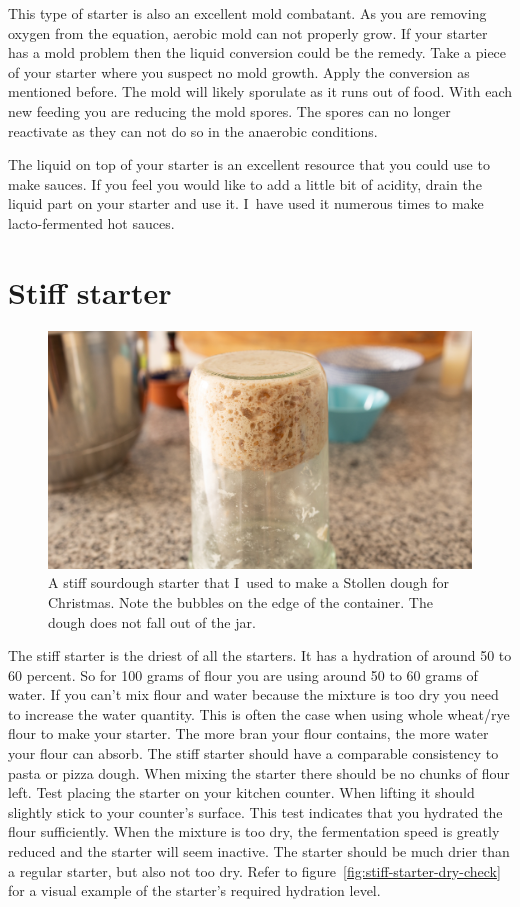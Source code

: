 This type of starter is also an excellent mold combatant. As you are removing
oxygen from the equation, aerobic mold can not properly grow. If your starter
has a mold problem then the liquid conversion could be the remedy. Take a
piece of your starter where you suspect no mold growth. Apply the conversion
as mentioned before. The mold will likely sporulate as it runs out of food.
With each new feeding you are reducing the mold spores. The spores can no
longer reactivate as they can not do so in the anaerobic conditions.

The liquid on top of your starter is an excellent resource that you could use
to make sauces. If you feel you would like to add a little bit of acidity,
drain the liquid part on your starter and use it. I~have used it numerous
times to make lacto-fermented hot sauces.

\section{Stiff starter}%
\label{section:stiff-starter}

\begin{figure}[!htb]
  \includegraphics[width=\textwidth]{sourdough-starter-stiff.jpg}
  \caption{A stiff sourdough starter that I~used to make a Stollen dough for Christmas. Note
  the bubbles on the edge of the container. The dough does not fall out of the
jar.}%
  \label{fig:stiff-sourdough-starter}
\end{figure}

The stiff starter is the driest of all the starters. It has a hydration of
around 50 to 60 percent. So for 100 grams of flour you are using around 50 to
60 grams of water. If you can't mix flour and water because the
mixture is too dry you need to increase the water quantity. This is often
the case when using whole wheat/rye flour to make your starter. The
more bran your flour contains, the more water your flour can absorb. The stiff
starter should have a comparable consistency to pasta or pizza dough. When
mixing the starter there should be no chunks of flour left. Test placing
the starter on your kitchen counter. When lifting it should slightly stick
to your counter's surface. This test indicates that you hydrated the flour sufficiently.
When the mixture is too dry, the fermentation speed is greatly reduced and
the starter will seem inactive. The starter should be much drier
than a regular starter, but also not too dry. Refer to figure~\ref{fig:stiff-starter-dry-check}
for a visual example of the starter's required hydration level. 

